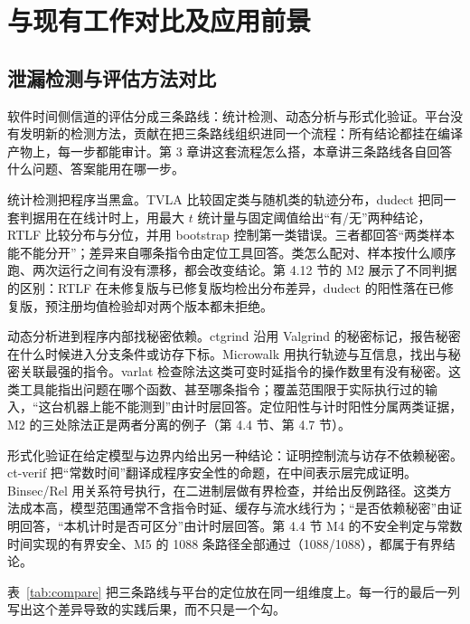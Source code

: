 
\section{与现有工作对比及应用前景}

\subsection{泄漏检测与评估方法对比}

软件时间侧信道的评估分成三条路线：统计检测、动态分析与形式化验证。平台没有发明新的检测方法，贡献在把三条路线组织进同一个流程：所有结论都挂在编译产物上，每一步都能审计。第 3 章讲这套流程怎么搭，本章讲三条路线各自回答什么问题、答案能用在哪一步。

统计检测把程序当黑盒。TVLA\cite{tvla} 比较固定类与随机类的轨迹分布，dudect\cite{dudect} 把同一套判据用在在线计时上，用最大 $t$ 统计量与固定阈值给出“有/无”两种结论，RTLF\cite{rtlf} 比较分布与分位，并用 bootstrap 控制第一类错误。三者都回答“两类样本能不能分开”；差异来自哪条指令由定位工具回答。类怎么配对、样本按什么顺序跑、两次运行之间有没有漂移，都会改变结论。第 4.12 节的 M2 展示了不同判据的区别：RTLF 在未修复版与已修复版均检出分布差异，dudect 的阳性落在已修复版，预注册均值检验却对两个版本都未拒绝。

动态分析进到程序内部找秘密依赖。ctgrind 沿用 Valgrind 的秘密标记，报告秘密在什么时候进入分支条件或访存下标\cite{ctgrind}。Microwalk 用执行轨迹与互信息，找出与秘密关联最强的指令\cite{microwalk}。varlat 检查除法这类可变时延指令的操作数里有没有秘密\cite{kyberslash}。这类工具能指出问题在哪个函数、甚至哪条指令；覆盖范围限于实际执行过的输入，“这台机器上能不能测到”由计时层回答。定位阳性与计时阳性分属两类证据，M2 的三处除法正是两者分离的例子（第 4.4 节、第 4.7 节）。

形式化验证在给定模型与边界内给出另一种结论：证明控制流与访存不依赖秘密。ct-verif 把“常数时间”翻译成程序安全性的命题，在中间表示层完成证明\cite{ctverif}。Binsec/Rel 用关系符号执行，在二进制层做有界检查，并给出反例路径\cite{binsec}。这类方法成本高，模型范围通常不含指令时延、缓存与流水线行为；“是否依赖秘密”由证明回答，“本机计时是否可区分”由计时层回答。第 4.4 节 M4 的不安全判定与常数时间实现的有界安全、M5 的 1088 条路径全部通过（1088/1088），都属于有界结论。

表~\ref{tab:compare} 把三条路线与平台的定位放在同一组维度上。每一行的最后一列写出这个差异导致的实践后果，而不只是一个勾。

